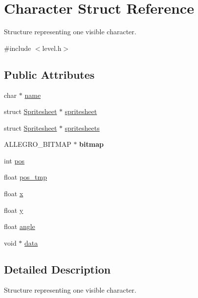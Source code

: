\hypertarget{structCharacter}{\section{Character Struct Reference}
\label{structCharacter}
}


Structure representing one visible character.  




{\ttfamily \#include $<$level.\+h$>$}

\subsection*{Public Attributes}
\begin{DoxyCompactItemize}
\item 
char $\ast$ \hyperlink{structCharacter_a35b249bfc82c52eebf91ae3999004105}{name}
\item 
struct \hyperlink{structSpritesheet}{Spritesheet} $\ast$ \hyperlink{structCharacter_a8934aff2a077c832127154837f383ef0}{spritesheet}
\item 
struct \hyperlink{structSpritesheet}{Spritesheet} $\ast$ \hyperlink{structCharacter_a374e3f2ef020ce410bc7968488798714}{spritesheets}
\item 
\hypertarget{structCharacter_a86a4123b1ea1eb5b497542608a61cbda}{A\+L\+L\+E\+G\+R\+O\+\_\+\+B\+I\+T\+M\+A\+P $\ast$ {\bfseries bitmap}}\label{structCharacter_a86a4123b1ea1eb5b497542608a61cbda}

\item 
int \hyperlink{structCharacter_ad905575b0331709b6188af9423b3aee1}{pos}
\item 
float \hyperlink{structCharacter_ac4da775bb44e81c8b33ffb1cb1f75108}{pos\+\_\+tmp}
\item 
float \hyperlink{structCharacter_a8db8f4fb44d770f8324dff6714b8dc73}{x}
\item 
float \hyperlink{structCharacter_a4e074a7f769265983cb1b06249a6b617}{y}
\item 
float \hyperlink{structCharacter_aaea3868e61a383b338ffef0949dc5d0c}{angle}
\item 
void $\ast$ \hyperlink{structCharacter_a501e967c7ba98f87aaf55772236f9d30}{data}
\end{DoxyCompactItemize}


\subsection{Detailed Description}
Structure representing one visible character. 

